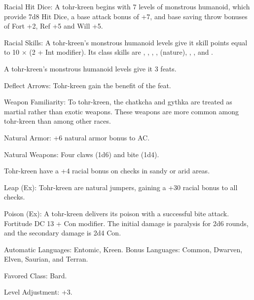 \begin{itemize*}
    \item Racial Hit Dice: A tohr-kreen begins with 7 levels of monstrous humanoid, which provide 7d8 Hit Dice, a base attack bonus of +7, and base saving throw bonuses of Fort +2, Ref +5 and Will +5.
    \item Racial Skills: A tohr-kreen's monstrous humanoid levels give it skill points equal to 10 $\times$ (2 + Int modifier). Its class skills are , , , ,  (nature), , , and .
    \item A tohr-kreen's monstrous humanoid levels give it 3 feats.
    \item Deflect Arrows: Tohr-kreen gain the benefit of the  feat.
    \item Weapon Familiarity: To tohr-kreen, the chatkcha and gythka are treated as martial rather than exotic weapons. These weapons are more common among tohr-kreen than among other races.


    \item Natural Armor: +6 natural armor bonus to AC.
    \item Natural Weapons: Four claws (1d6) and bite (1d4). %

    \item Tohr-kreen have a +4 racial bonus on  checks in sandy or arid areas.
    \item Leap (Ex): Tohr-kreen are natural jumpers, gaining a +30 racial bonus to all  checks.
    \item Poison (Ex): A tohr-kreen delivers its poison with a successful bite attack. Fortitude DC 13 + Con modifier. The initial damage is paralysis for 2d6 rounds, and the secondary damage is 2d4 Con.

    \item Automatic Languages: Entomic, Kreen. Bonus Languages: Common, Dwarven, Elven, Saurian, and Terran.
    \item Favored Class: Bard.
    \item Level Adjustment: +3.
\end{itemize*}
